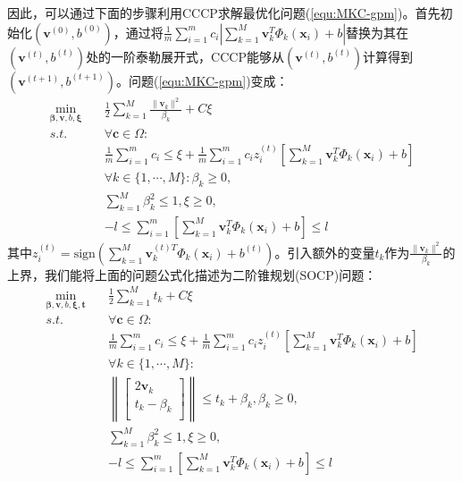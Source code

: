 因此，可以通过下面的步骤利用CCCP求解最优化问题(\ref{equ:MKC-gpm})。首先初始化$(\mathbf{v}^{(0)},b^{(0)})$，通过将$\frac{1}{m}\sum^m_{i=1}c_i\left |\sum^M_{k=1}\mathbf{v}_k^T\Phi_k(\mathbf{x}_i)+b \right | $替换为其在$(\mathbf{v}^{(t)},b^{(t)})$处的一阶泰勒展开式，CCCP能够从$(\mathbf{v}^{(t)},b^{(t)})$计算得到$(\mathbf{v}^{(t+1)},b^{(t+1)})$。问题(\ref{equ:MKC-gpm})变成：
\begin{equation}
\begin{split}
\min_{\mathbf{\beta},\mathbf{v},b,\mathbf{\xi}} \quad & \frac{1}{2}\sum^M_{k=1}\frac{\|\mathbf{v}_k\|^2}{\beta_k}+C\xi \\
s.t. \quad & \forall \mathbf{c}\in \Omega: \\
& \frac{1}{m}\sum^m_{i=1}c_i \le \xi + \frac{1}{m}\sum^m_{i=1}c_iz^{(t)}_i \left [\sum^M_{k=1}\mathbf{v}_k^T\Phi_k(\mathbf{x}_i)+b \right ]\\
& \forall k \in \{1,\cdots,M\}:\beta_k \ge 0, \\
& \sum^M_{k=1}\beta_k^2 \le 1, \xi \ge 0,\\
& -l \le \sum^m_{i=1}\left[\sum^M_{k=1}\mathbf{v}_k^T\Phi_k(\mathbf{x}_i)+b\right] \le l
\end{split}
\end{equation}
其中$z^{(t)}_i=\mathrm{sign}(\sum^M_{k=1}\mathbf{v}_k^{(t)T}\Phi_k(\mathbf{x}_i)+b^{(t)})$。引入额外的变量$t_k$作为$\frac{\|\mathbf{v}_k\|^2}{\beta_k}$的上界，我们能将上面的问题公式化描述为二阶锥规划(SOCP)问题：
\begin{equation}
\begin{split}
\min_{\mathbf{\beta},\mathbf{v},b,\mathbf{\xi},\mathbf{t}} \quad & \frac{1}{2}\sum^M_{k=1}t_k+C\xi \\
s.t. \quad & \forall \mathbf{c}\in \Omega: \\
& \frac{1}{m}\sum^m_{i=1}c_i \le \xi + \frac{1}{m}\sum^m_{i=1}c_iz^{(t)}_i \left [\sum^M_{k=1}\mathbf{v}_k^T\Phi_k(\mathbf{x}_i)+b \right ]\\
& \forall k \in \{1,\cdots,M\}: \\
& \left\|\left[\begin{matrix} %
      2\mathbf{v}_k \\
      t_k-\beta_k \\
   \end{matrix}\right]\right\| \le t_k+\beta_k,
  \beta_k \ge 0, \\
& \sum^M_{k=1}\beta_k^2 \le 1, \xi \ge 0,\\
& -l \le \sum^m_{i=1}\left[\sum^M_{k=1}\mathbf{v}_k^T\Phi_k(\mathbf{x}_i)+b\right] \le l
\label{equ:MKC-SOCP}
\end{split}
\end{equation}

